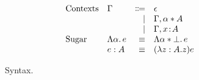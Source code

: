 \documentclass[preprint]{sigplanconf}
\begin{document}
\begin{figure}
\[\begin{array}{l}
\begin{array}{llrll}
      \\
      \text{Contexts}
      & \Gamma & \Coloneqq & \epsilon         & \\
      &        & \mid & \Gamma, \alpha * A       & \\
      &        & \mid & \Gamma, x \!:\! A     & \\

      \text{Sugar} & \Lambda \alpha.\, e & \equiv & \Lambda \alpha * \bot.\, e & \\
                   & e : A &  \equiv & (\lambda z : A . z) e &
    \end{array}
  \end{array}
  \]
  \caption{Syntax.}
\end{figure}


%   

%


\end{document}
